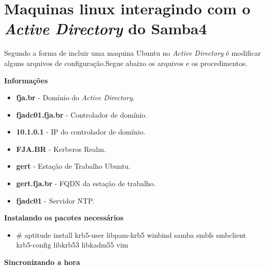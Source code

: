 
\section{Maquinas linux interagindo com o \textit{Active Directory} do  Samba4}

Segundo \cite{UBUNTU-WIKI} a forma de incluir uma maquina Ubuntu no \textit{Active Directory} é modificar alguns arquivos de configuração.Segue abaixo os arquivos e os procedimentos.

\textbf{Informações}

\begin{itemize}
	\item \textbf{fja.br} -  Domínio do \textit{Active Directory}.
	\item \textbf{fjadc01.fja.br} - Controlador de domínio.
	\item \textbf{10.1.0.1} - IP do controlador de domínio.
	\item \textbf{FJA.BR} - Kerberos Realm.
	\item \textbf{gert} - Estação de Trabalho Ubuntu.
	\item \textbf{gert.fja.br} - FQDN da estação de trabalho.
	\item \textbf{fjadc01} - Servidor NTP.
\end{itemize}

\textbf{Instalando os pacotes necessários}

\begin{itemize}
	\item {\# aptitude install krb5-user libpam-krb5 winbind samba smbfs smbclient krb5-config libkrb53 libkadm55 vim}
\end{itemize}

\textbf{Sincronizando a hora}

